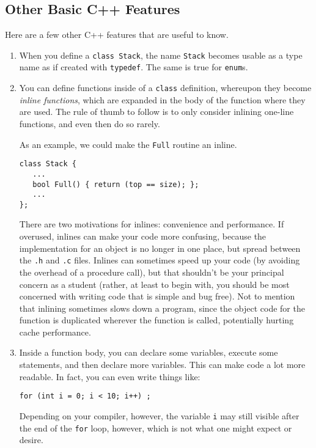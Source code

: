 \subsection{Other Basic C++ Features}

Here are a few other C++ features that are useful to know.

\begin{enumerate}

\item When you define a {\tt class Stack}, the name {\tt Stack} becomes
usable as a type name as if created with {\tt typedef}.  The same is
true for {\tt enum}s.

\item You can define functions inside of a {\tt class} definition,
whereupon they become {\it inline functions}, which are expanded in
the body of the function where they are used.  The rule of thumb to
follow is to only consider inlining one-line functions, and even then 
do so rarely.  

As an example, we could make the {\tt Full} routine an inline.

\begin{verbatim}
class Stack {
   ...
   bool Full() { return (top == size); };
   ...
};
\end{verbatim}

There are two motivations for inlines: convenience
and performance.  If overused, inlines can make your code more confusing,
because the implementation for an object is no longer in one place, 
but spread between the {\tt .h} and {\tt .c} files.  Inlines can sometimes
speed up your code (by avoiding the overhead of a procedure call), but 
that shouldn't be your principal concern as a student (rather, at least to 
begin with, you should be most concerned with writing code that is simple 
and bug free).  Not to mention that inlining sometimes slows down a program,
since the object code for the function is duplicated wherever the function 
is called, potentially hurting cache performance.

\item Inside a function body, you can declare some variables, execute
some statements, and then declare more variables.  This can make code
a lot more readable.  In fact, you can even write things like:

\begin{verbatim}
for (int i = 0; i < 10; i++) ;
\end{verbatim}

Depending on your compiler, however, the variable {\tt i} may still visible
after the end of the {\tt for}
loop, however, which is not what one might expect or desire.


\end{enumerate}
